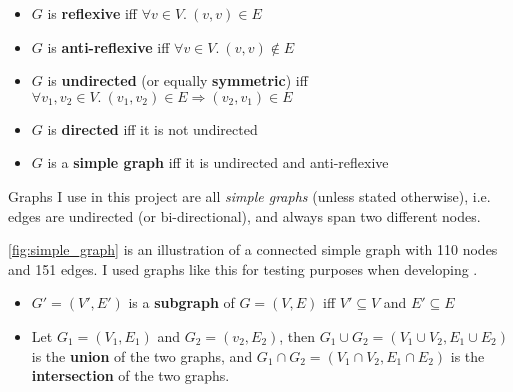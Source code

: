 \begin{definition}
    \begin{itemize}[leftmargin=*]
        \item $G$ is \textbf{reflexive} iff $\forall v \in V.\ (v, v) \in E$
        \item $G$ is \textbf{anti-reflexive} iff $\forall v \in V.\ (v, v) \notin E$
        \item $G$ is \textbf{undirected} (or equally \textbf{symmetric}) iff $\forall v_1, v_2 \in V.\ (v_1, v_2) \in E \Rightarrow (v_2, v_1) \in E$
        \item $G$ is \textbf{directed} iff it is not undirected
        \item $G$ is a \textbf{simple graph} iff it is undirected and anti-reflexive
    \end{itemize}
\end{definition}

Graphs I use in this project are all \textsl{simple graphs} (unless stated otherwise), i.e. edges are undirected (or bi-directional), and always span two different nodes.



\autoref{fig:simple_graph} is an illustration of a connected simple graph with 110 nodes and 151 edges.
I used graphs like this for testing purposes when developing \graffs.

\begin{definition}
    \begin{itemize}[leftmargin=*]
        \item $G' = (V', E')$ is a \textbf{subgraph} of $G = (V, E)$ iff $V' \subseteq V$ and $E' \subseteq E$
        \item Let $G_1 = (V_1, E_1)$ and $G_2 = (v_2, E_2)$, then $G_1 \cup G_2 = (V_1 \cup V_2, E_1 \cup E_2)$ is the \textbf{union} of the two graphs, and $G_1 \cap G_2 = (V_1 {\cap} V_2, E_1 {\cap} E_2)$ is the \textbf{intersection} of the two graphs.
    \end{itemize}
\end{definition}

